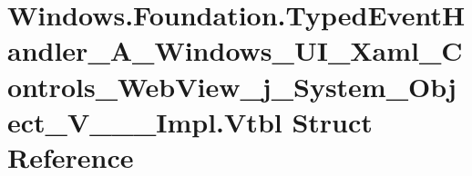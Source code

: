 \hypertarget{struct_windows_1_1_foundation_1_1_typed_event_handler___a___windows___u_i___xaml___controls___weea5b22fbafcb30e85441c364b622cfb7}{}\section{Windows.\+Foundation.\+Typed\+Event\+Handler\+\_\+\+A\+\_\+\+Windows\+\_\+\+U\+I\+\_\+\+Xaml\+\_\+\+Controls\+\_\+\+Web\+View\+\_\+j\+\_\+\+System\+\_\+\+Object\+\_\+\+V\+\_\+\+\_\+\+\_\+\+Impl.\+Vtbl Struct Reference}
\label{struct_windows_1_1_foundation_1_1_typed_event_handler___a___windows___u_i___xaml___controls___weea5b22fbafcb30e85441c364b622cfb7}
